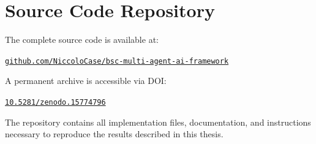 \section*{Source Code Repository}
\noindent The complete source code is available at:
\begin{center}
\href{https://github.com/NiccoloCase/bsc-multi-agent-ai-framework}{\texttt{github.com/NiccoloCase/bsc-multi-agent-ai-framework}}
\end{center}

\noindent A permanent archive is accessible via DOI:
\begin{center}
\href{https://doi.org/10.5281/zenodo.15774796}{\texttt{10.5281/zenodo.15774796}}
\end{center}

\noindent The repository contains all implementation files, documentation, and instructions necessary to reproduce the results described in this thesis.